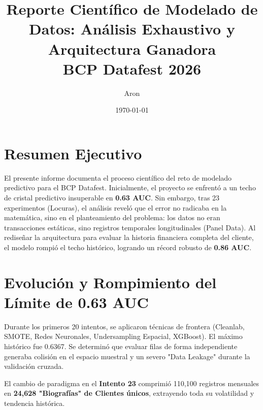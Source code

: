\documentclass[a4paper,11pt]{article}
\title{\textbf{Reporte Científico de Modelado de Datos: Análisis Exhaustivo y Arquitectura Ganadora} \\ \Large BCP Datafest 2026}
\author{Aron}
\date{\today}
\begin{document}
\maketitle
\tableofcontents
\newpage

\section{Resumen Ejecutivo}
El presente informe documenta el proceso científico del reto de modelado predictivo para el BCP Datafest. Inicialmente, el proyecto se enfrentó a un techo de cristal predictivo insuperable en \textbf{0.63 AUC}. Sin embargo, tras 23 experimentos (Locuras), el análisis reveló que el error no radicaba en la matemática, sino en el planteamiento del problema: los datos no eran transacciones estáticas, sino registros temporales longitudinales (Panel Data). Al rediseñar la arquitectura para evaluar la historia financiera completa del cliente, el modelo rompió el techo histórico, logrando un récord robusto de \textbf{0.86 AUC}.

\section{Evolución y Rompimiento del Límite de 0.63 AUC}

Durante los primeros 20 intentos, se aplicaron técnicas de frontera (Cleanlab, SMOTE, Redes Neuronales, Undersampling Espacial, XGBoost). El máximo histórico fue 0.6367. Se determinó que evaluar filas de forma independiente generaba colisión en el espacio muestral y un severo "Data Leakage" durante la validación cruzada.

El cambio de paradigma en el \textbf{Intento 23} comprimió 110,100 registros mensuales en \textbf{24,628 "Biografías" de Clientes únicos}, extrayendo toda su volatilidad y tendencia histórica.
\end{document}
